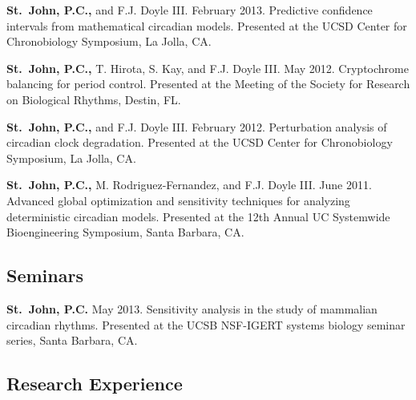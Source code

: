 {{\bfseries St.\ John, P.C.,} and F.J. Doyle III. February 2013. Predictive confidence intervals from mathematical circadian models. Presented at the UCSD Center for Chronobiology Symposium, La Jolla, CA.


{\bfseries St.\ John, P.C.,} T. Hirota, S. Kay, and F.J. Doyle III. May 2012. Cryptochrome balancing for period control. Presented at the Meeting of the Society for Research on Biological Rhythms, Destin, FL.

{\bfseries St.\ John, P.C.,} and F.J. Doyle III. February 2012. Perturbation analysis of circadian clock degradation. Presented at the UCSD Center for Chronobiology Symposium, La Jolla, CA.

{\bfseries St.\ John, P.C.,} M. Rodriguez-Fernandez, and F.J. Doyle III.  June 2011. Advanced global optimization and sensitivity techniques for analyzing deterministic circadian models. Presented at the 12th Annual UC Systemwide Bioengineering Symposium, Santa Barbara, CA.





\subsection*{Seminars}
{\bfseries St.\ John, P.C.} May 2013. Sensitivity analysis in the study of
mammalian circadian rhythms. Presented at the UCSB NSF-IGERT systems biology
seminar series, Santa Barbara, CA.

\subsection*{Research Experience}

}
